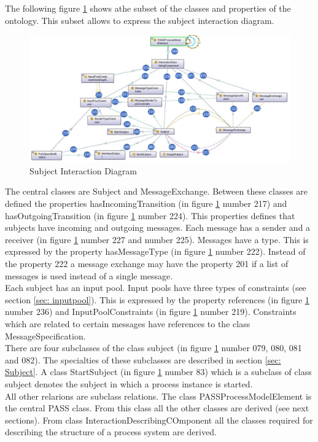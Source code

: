 The following figure \ref{fig:ontogrsubjectinteraction} shows athe subset of the classes and properties of the ontology. This subset allows to express the subject interaction diagram. 

\begin{figure}[ph]
	\centering
	\includegraphics[width=1.0\linewidth]{20181026-Ontologie-Bilder/Grafiken-Ontologie/SUbject-Interaction/OntoGrSubjectInteraction}
	\caption[Subject Interaction Diagram]{Subject Interaction Diagram}
	\label{fig:ontogrsubjectinteraction}
\end{figure}


The central classes are Subject and MessageExchange. Between these classes are defined the properties hasIncomingTransition (in figure \ref{fig:ontogrsubjectinteraction} number 217) and hasOutgoingTransition (in figure \ref{fig:ontogrsubjectinteraction} number 224). This properties defines that subjects have incoming and outgoing messages. Each message has a sender and a receiver (in figure \ref{fig:ontogrsubjectinteraction} number 227 and number 225). Messages have a type. This is expressed by the property hasMessageType (in figure \ref{fig:ontogrsubjectinteraction} number 222). Instead of the property 222 a message exchange may have the property 201 if a list of messages is used instead of a single message.\\
Each subject has an input pool. Input pools have three types of constraints (see section \ref{sec: inputpool}). This is expressed by the property references  (in figure \ref{fig:ontogrsubjectinteraction} number 236) and InputPoolConstraints (in figure \ref{fig:ontogrsubjectinteraction} number 219). Constraints which are related to certain messages have references to the class MessageSpecification.\\
There are four subclasses of the class subject (in figure \ref{fig:ontogrsubjectinteraction} number 079, 080, 081 and 082). The specialties of these subclasses are described in section \ref{sec: Subject}. A class StartSubject (in figure \ref{fig:ontogrsubjectinteraction} number 83) which is a subclass of class subject denotes the subject in which a process instance is started.\\
All other relarions are subclass relations. The class PASSProcessModelElement is the central PASS class. From this class all the other classes are derived (see next sections). From class InteractionDescribingCOmponent all the classes required for describing the structure of a process system are derived.


